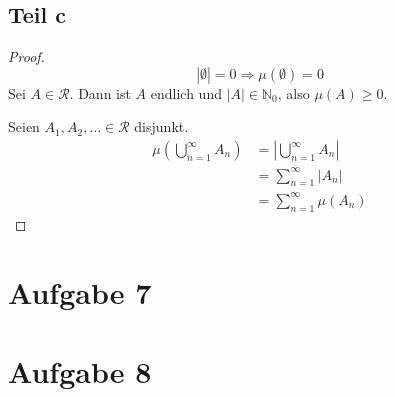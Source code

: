 \documentclass[10pt,a4paper]{article}
\begin{document}
\subsection{Teil c}
\begin{proof}
  \begin{equation}
    |\emptyset| = 0 \Rightarrow \mu(\emptyset) = 0
  \end{equation}
  Sei $A \in \mathscr{R}$.
  Dann ist $A$ endlich und $|A| \in \mathbb{N}_{0}$, also $\mu(A) \ge 0$.
  
  Seien $A_{1}, A_{2}, \dots \in \mathscr{R}$ disjunkt.
  \begin{align*}
    \mu(\bigcup_{n = 1}^{\infty} A_{n}) & = |\bigcup_{n = 1}^{\infty} A_{n}|\\
    & = \sum_{n = 1}^{\infty} |A_{n}|\\
    & = \sum_{n = 1}^{\infty} \mu(A_{n})
  \end{align*}
\end{proof}

\section{Aufgabe 7}

\section{Aufgabe 8}
\end{document}
